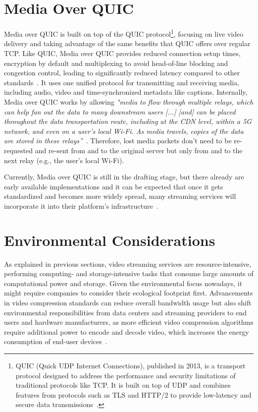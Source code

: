 \section{Media Over QUIC}

Media over QUIC is built on top of the QUIC protocol\footnote{QUIC (Quick UDP Internet Connections), published in 2013, is a transport protocol designed to address the performance and security limitations of traditional protocols like TCP. It is built on top of UDP and combines features from protocols such as TLS and HTTP/2 to provide low-latency and secure data transmissions~\parencite{quic}.}, focusing on live video delivery and taking advantage of the same benefits that QUIC offers over regular TCP. Like QUIC, Media over QUIC provides reduced connection setup times, encryption by default and multiplexing to avoid head-of-line blocking and congestion control, leading to significantly reduced latency compared to other standards~\parencite{moq_ieft}. It uses one unified protocol for transmitting and receiving media, including audio, video and time-synchronized metadata like captions. Internally, Media over QUIC works by allowing \textit{"media to flow through multiple relays, which can help fan out the data to many downstream users [...] [and] can be placed throughout the data transportation route, including at the \ac{CDN} level, within a 5G network, and even on a user’s local Wi-Fi. As media travels, copies of the data are stored in these relays”}~\parencite{moq_ieft}. Therefore, lost media packets don’t need to be re-requested and re-sent from and to the original server but only from and to the next relay (e.g., the user’s local Wi-Fi).

Currently, Media over QUIC is still in the drafting stage, but there already are early available implementations and it can be expected that once it gets standardized and becomes more widely spread, many streaming services will incorporate it into their platform’s infrastructure~\parencite{moq_project}.

\section{Environmental Considerations}

As explained in previous sections, video streaming services are resource-intensive, performing computing- and storage-intensive tasks that consume large amounts of computational power and storage.
Given the environmental focus nowadays, it might require companies to consider their ecological footprint first. Advancements in video compression standards can reduce overall bandwidth usage but also shift environmental responsibilities from data centers and streaming providers to end users and hardware manufacturers, as more efficient video compression algorithms require additional power to encode and decode video, which increases the energy consumption of end-user devices~\parencite{save_environment}.